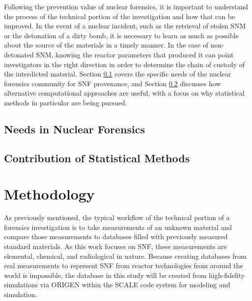 Following the prevention value of nuclear forensics, it is important to
understand the process of the technical portion of the investigation and how
that can be improved.  In the event of a nuclear incident, such as the
retrieval of stolen \gls{SNM} or the detonation of a dirty bomb, it is
necessary to learn as much as possible about the source of the materials in a
timely manner. In the case of non-detonated \gls{SNM}, knowing the reactor
parameters that produced it can point investigators in the right direction in
order to determine the chain of custody of the interdicted material.  Section
\ref{sec:nfneeds} covers the specific needs of the nuclear forensics community
for \gls{SNF} provenance, and Section \ref{sec:statscontrib} discusses how
alternative computational approaches are useful, with a focus on why
statistical methods in particular are being pursued. 

\subsection{Needs in Nuclear Forensics}

\label{sec:nfneeds}

\subsection{Contribution of Statistical Methods}

\label{sec:statscontrib}

\section{Methodology}
\label{sec:methodology}

As previously mentioned, the typical workflow of the technical portion of a
forensics investigation is to take measurements of an unknown material and
compare those measurements to databases filled with previously measured
standard materials. As this work focuses on \gls{SNF}, these measurements are
elemental, chemical, and radiological in nature.  Because creating databases
from real measurements to represent \gls{SNF} from reactor technologies from
around the world is impossible, the database in this study will be created from
high-fidelity simulations via \gls{ORIGEN} \cite{origen} within the SCALE code
system \cite{scale} for modeling and simulation. 

